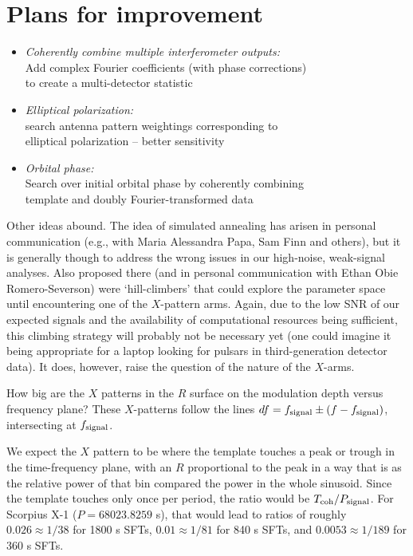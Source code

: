 \section{Plans for improvement}

\begin{itemize}
\item \emph{Coherently combine multiple interferometer outputs: }\\
Add complex Fourier coefficients (with phase corrections)\\
to create a multi-detector statistic
\item \emph{Elliptical polarization:}\\
search antenna pattern weightings corresponding to\\
elliptical polarization -- better sensitivity
\item \emph{Orbital phase:}\\
Search over initial orbital phase by coherently combining\\
template and doubly Fourier-transformed data
\end{itemize}


Other ideas abound. The idea of simulated annealing has arisen in personal communication (e.g., with Maria Alessandra Papa, Sam Finn and others), but it is generally though to address the wrong issues in our high-noise, weak-signal analyses. Also proposed there (and in personal communication with Ethan Obie Romero-Severson) were `hill-climbers' that could explore the parameter space until encountering one of the $X$-pattern arms. Again, due to the low SNR of our expected signals and the availability of computational resources being sufficient, this climbing strategy will probably not be necessary yet (one could imagine it being appropriate for a laptop looking for pulsars in third-generation detector data). It does, however, raise the question of the nature of the $X$-arms.

            How big are the $X$ patterns in the $R$ surface on the modulation depth versus frequency plane?
These $X$-patterns follow the lines $df = f_{\textup{signal}} \pm (f - f_\textup{signal})$, intersecting at $f_\textup{signal}$.

We expect the $X$ pattern to be where the template touches a peak or trough in the time-frequency plane, with an $R$ proportional to the peak in a way that is as the relative power of that bin compared the power in the whole sinusoid. 
Since the template touches only once per period, the ratio would be $T_{\textup{coh}} / P_{\textup{signal}}$. For Scorpius X-1 ($P = 68023.8259$ s), that would lead to ratios of roughly $0.026 \approx 1/38$ for 1800 s SFTs, $0.01 \approx 1/81$ for 840 s SFTs, and $0.0053 \approx 1/189$ for 360 s SFTs.

